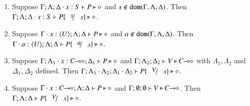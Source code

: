 \begin{lemma}\rm
	\label{l:subst}
	\begin{enumerate}[1.]
		\item	Suppose $\Gamma; \Lambda; \Delta \cdot x:S  \vdash P \triangleright \diamond$ and
			$s \not\in \mathtt{dom}(\Gamma, \Lambda, \Delta)$. 
			Then $\Gamma; \Lambda; \Delta \cat s:S  \vdash P\subst{s}{x} \hastype \Proc$.

		\item	Suppose $\Gamma \cdot x:\langle U \rangle; \Lambda; \Delta \vdash P \triangleright \diamond$ and
			$a \notin \mathtt{dom}(\Gamma, \Lambda, \Delta)$. 
			Then $\Gamma \cat a:\chtype{U}; \Lambda; \Delta   \vdash P\subst{a}{x} \hastype \Proc$.

		\item	Suppose $\Gamma; \Lambda_1 \cdot x:C\!\! \multimap\!\! \diamond; \Delta_1  \vdash P \triangleright \diamond$ 
			and $\Gamma; \Lambda_2; \Delta_2  \vdash V \triangleright C\!\! \multimap\!\! \diamond$ with 
			$\Lambda_1, \Lambda_2$ and $\Delta_1, \Delta_2$ defined.  
			Then $\Gamma; \Lambda_1 \cat \Lambda_2; \Delta_1 \cat \Delta_2  \proves P\subst{V}{x} \hastype \Proc$.

		\item	Suppose $\Gamma \cdot x:C\!\! \rightarrow\!\! \diamond; \Lambda; \Delta  \vdash P \triangleright \diamond$ and
			$\Gamma; \emptyset ; \emptyset  \vdash V \triangleright C\!\! \rightarrow\!\! \diamond$.
			Then $\Gamma; \Lambda; \Delta  \proves P\subst{V}{x} \hastype \Proc$.
		\end{enumerate}
\end{lemma}

